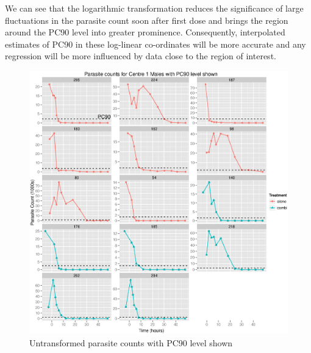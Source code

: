 We can see that the logarithmic transformation reduces the significance of large fluctuations in the parasite count soon after first dose and brings the region around the PC90 level into greater prominence. Consequently, interpolated estimates of PC90 in these log-linear co-ordinates will be more accurate and any regression will be more influenced by data close to the region of interest.  
\begin{figure}[p]
\begin{center}
\includegraphics[width=150mm]{raw901M.eps}
\caption{Untransformed parasite counts with PC90 level shown}
\label{raw901M}
\end{center}
\end{figure}
